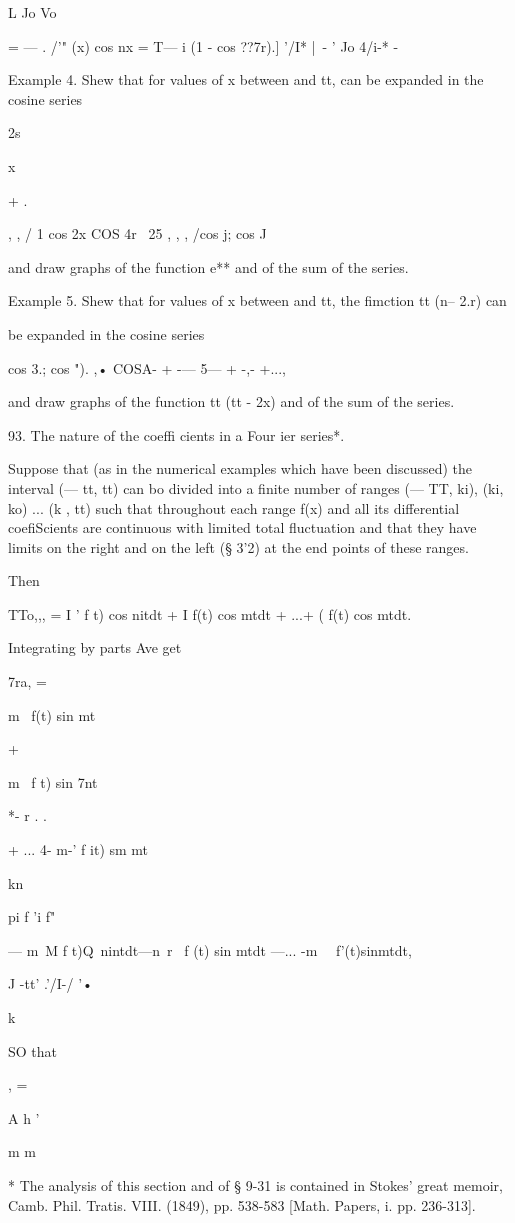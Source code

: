   L Jo Vo

= — . /'" (x) cos nx = T— i (1 - cos ??7r).] '/I* |\ - ' Jo 4/i-* -

Example 4. Shew that for values of x between and tt, can be expanded
in the cosine series

2s

 x

+ .

, , / 1 cos 2x COS 4r \ 25 , , , /cos j; cos J

and draw graphs of the function e** and of the sum of the series.

Example 5. Shew that for values of x between and tt, the fimction tt
(n-- 2.r) can

be expanded in the cosine series

cos 3.; cos "). ,• COSA- + -— 5— + -,- +...,

and draw graphs of the function tt (tt - 2x) and of the sum of the
series.

93. The nature of the coeffi cients in a Four ier series*.

Suppose that (as in the numerical examples which have been discussed)
the interval (— tt, tt) can bo divided into a finite number of ranges
(— TT, ki), (ki, ko) ... (k , tt) such that throughout each range f(x)
and all its differential coefiScients are continuous with limited
total fluctuation and that they have limits on the right and on the
left (§ 3'2) at the end points of these ranges.

Then

TTo,,, = I ' f t) cos nitdt + I f(t) cos mtdt + ...+ ( f(t) cos mtdt.

Integrating by parts Ave get

7ra, =

m~ f(t) sin mt

+

m~ f t) sin 7nt

*- r . .

+ ... 4- m-' f it) sm mt

kn

pi f 'i f"

— m~M f t)Q\ nintdt—n\ r \ f (t) sin mtdt —... -m~ \ f'(t)sinmtdt,

J -tt' .'/I-/ '•

k

SO that

 , =

A h '

m m

* The analysis of this section and of § 9-31 is contained in Stokes'
great memoir, Camb. Phil. Tratis. VIII. (1849), pp. 538-583 [Math.
Papers, i. pp. 236-313].

